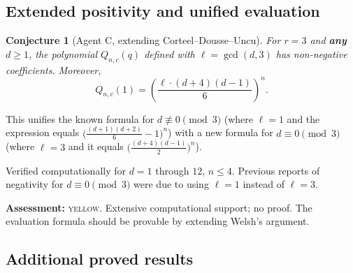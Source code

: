 \documentclass[11pt]{article}
\newtheorem{conjecture}[theorem]{Conjecture}
\theoremstyle{definition}
\begin{document}
\subsection{Extended positivity and unified evaluation}\label{sec:extended}

\begin{conjecture}[Agent C, extending Corteel--Dousse--Uncu]\label{conj:extended}
For $r = 3$ and \textbf{any} $d \geq 1$, the polynomial $Q_{n,c}(q)$ defined with $\ell = \gcd(d, 3)$ has non-negative coefficients. Moreover,
\[
Q_{n,c}(1) = \left(\frac{\ell \cdot (d+4)(d-1)}{6}\right)^n.
\]
\end{conjecture}

\noindent This unifies the known formula for $d \not\equiv 0\!\pmod{3}$ (where $\ell = 1$ and the expression equals $\bigl(\tfrac{(d+1)(d+2)}{6} - 1\bigr)^n$) with a new formula for $d \equiv 0\!\pmod{3}$ (where $\ell = 3$ and it equals $\bigl(\tfrac{(d+4)(d-1)}{2}\bigr)^n$).

Verified computationally for $d = 1$ through $12$, $n \leq 4$. Previous reports of negativity for $d \equiv 0\!\pmod{3}$ were due to using $\ell = 1$ instead of $\ell = 3$.

\noindent\textbf{Assessment:} \textsc{yellow}. Extensive computational support; no proof. The evaluation formula should be provable by extending Welsh's argument.

\subsection{Additional proved results}
\end{document}
